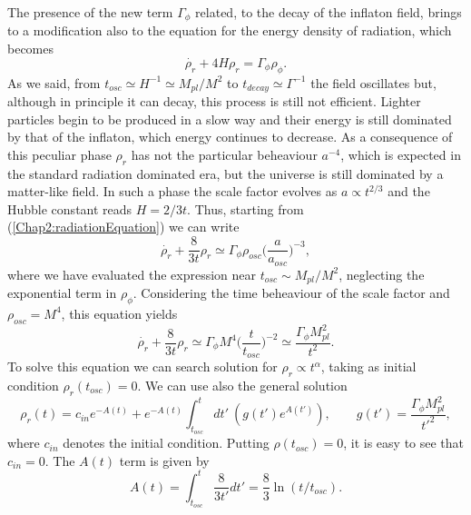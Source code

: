 \documentclass[11pt,a4paper,twoside]{book}
\begin{document}
The presence of the new term $\Gamma_{\phi}$ related,  to the decay of the inflaton field, brings to a modification also to the equation for the energy density of radiation, which becomes
\begin{equation}
	\label{Chap2:radiationEquation}
	\dot{\rho_{r}} + 4H\rho_{r} = \Gamma_{\phi}\rho_{\phi}.
\end{equation}
As we said, from $ t_{osc} \simeq H^{-1} \simeq M_{pl}/M^{2} $ to $ t_{decay} \simeq \Gamma^{-1} $ the field oscillates but, although in principle it can decay, this process is still not efficient. Lighter particles begin to be produced in a slow way and their energy is still dominated by that of the inflaton, which energy continues to decrease.
As a consequence of this peculiar phase $\rho_{r}$ has not the particular beheaviour $ a^{-4} $, which is expected in the standard radiation dominated era, but the universe is still dominated by a matter-like field. In such a phase the scale factor evolves as $ a \propto t^{2/3} $ and the Hubble constant reads $ H=2/3t $.
Thus, starting from (\ref{Chap2:radiationEquation}) we can write
\begin{equation}
	\label{Chap2:radiationEquation2}
	\dot{\rho_{r}} + \frac{8}{3t}\rho_{r}\simeq \Gamma_{\phi}\rho_{osc}\Big (\frac{a}{a_{osc}}\Big)^{-3},
\end{equation}
where we have evaluated the expression near $ t_{osc} \sim M_{pl}/M^{2} $, neglecting the exponential term in $\rho_{\phi}$. Considering the time beheaviour of the scale factor  and $\rho_{osc}=M^{4}$, this equation yields
\begin{equation}
	\label{Chap2:radiation3}
		\dot{\rho_{r}} + \frac{8}{3t}\rho_{r} \simeq \Gamma_{\phi} M^{4} \Big (\frac{t}{t_{osc}}\Big)^{-2} \simeq \frac{\Gamma_{\phi} M_{pl}^{2}}{t^{2}}.
\end{equation}
To solve this equation we can search solution for $ \rho_{r} \propto t^{\alpha} $, taking as initial condition $\rho_{r}(t_{osc})=0$. We can use also the general solution
\begin{equation}
	\label{Chap2:generalSolution}
	\rho_{r}(t)=c_{in}e^{-A(t)} + e^{-A(t)} \int_{t_{osc}}^{t}dt'\ (g(t')e^{A(t')}), \qquad 
	g(t') = \frac{\Gamma_{\phi} M_{pl}^{2}}{t'^{2}}  ,
\end{equation}
where $ c_{in} $ denotes the initial condition. Putting $ \rho(t_{osc})=0 $, it is easy to see that $ c_{in}=0 $. The $ A(t) $ term is given by
\begin{equation}
	\label{Chap2:A(t)2}
	A(t)=\int_{t_{osc}}^{t}\frac{8}{3t'}dt'=\frac{8}{3}\ln(t/t_{osc}).
\end{equation}
\end{document}
